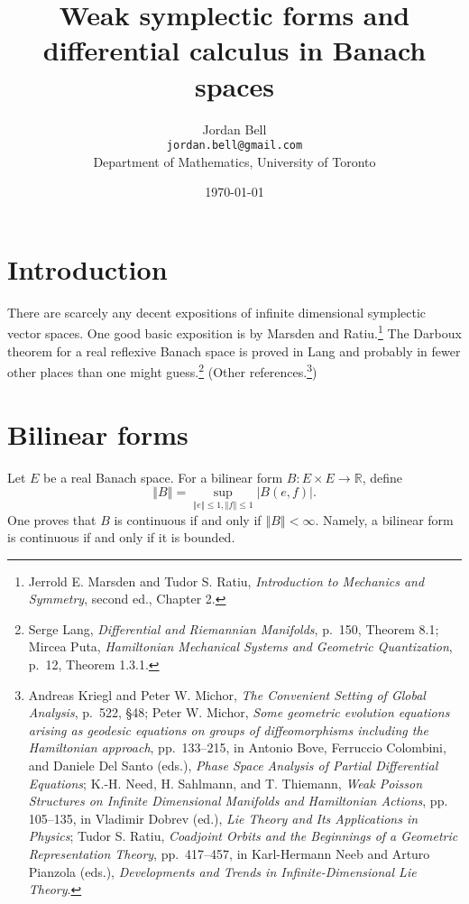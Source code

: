\documentclass{article}
\newcommand{\norm}[1]{\left\Vert #1 \right\Vert}
\theoremstyle{definition}
\begin{document}
\title{Weak symplectic forms and differential calculus in Banach spaces}
\author{Jordan Bell\\ \texttt{jordan.bell@gmail.com}\\Department of Mathematics, University of Toronto}
\date{\today}

\maketitle

\section{Introduction}
There are scarcely any decent expositions of infinite dimensional symplectic vector spaces. One good basic exposition
is by Marsden and Ratiu.\footnote{Jerrold E. Marsden and Tudor S. Ratiu, {\em Introduction to Mechanics and Symmetry}, second ed.,
Chapter 2.} The Darboux theorem for a real reflexive Banach space is proved in Lang and probably in fewer other places than one might
guess.\footnote{Serge Lang,
{\em Differential and Riemannian Manifolds}, p.~150, Theorem 8.1;
Mircea Puta, {\em Hamiltonian Mechanical Systems and Geometric Quantization}, p.~12, Theorem 1.3.1.}
(Other references.\footnote{Andreas Kriegl and Peter W. Michor, {\em The Convenient Setting of Global Analysis}, p.~522, \S 48;
Peter W. Michor,
{\em Some geometric evolution equations arising as geodesic equations on groups of diffeomorphisms including the Hamiltonian approach},
pp.~133--215, in
Antonio Bove, Ferruccio Colombini, and Daniele Del Santo (eds.), {\em Phase Space Analysis of Partial Differential Equations};
K.-H. Need, H. Sahlmann, and T. Thiemann, {\em Weak Poisson Structures on Infinite Dimensional Manifolds
and Hamiltonian Actions}, pp. 105--135, in Vladimir Dobrev (ed.), {\em Lie Theory and Its Applications in Physics};
Tudor S. Ratiu, {\em Coadjoint Orbits and the Beginnings of a Geometric Representation Theory}, pp.~417--457, in 
Karl-Hermann Neeb and Arturo Pianzola (eds.), {\em Developments and Trends in Infinite-Dimensional Lie Theory}.})


\section{Bilinear forms}
Let $E$ be a real Banach space. For a bilinear form $B:E \times E \to \mathbb{R}$, define
\[
\norm{B} = \sup_{\norm{e} \leq 1, \norm{f} \leq 1} |B(e,f)|.
\]
One proves that $B$ is continuous if and only if $\norm{B}<\infty$. Namely, a bilinear form is continuous if and only if it is bounded.
\end{document}
